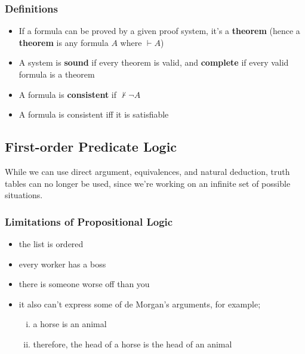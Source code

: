 \documentclass[a4paper, 12pt]{article}
\begin{document}
        \subsubsection*{Definitions}
        \begin{itemize}
            \item If a formula can be proved by a given proof system, it's a \textbf{theorem} (hence a \textbf{theorem} is any formula $A$ where $\vdash A$)
            \item A system is \textbf{sound} if every theorem is valid, and \textbf{complete} if every valid formula is a theorem
            \item A formula is \textbf{consistent} if $\nvdash \neg A$
            \item A formula is consistent iff it is satisfiable
        \end{itemize}
        \subsection*{First-order Predicate Logic}
        While we can use direct argument, equivalences, and natural deduction, truth tables can no longer be used, since we're working on an infinite set of possible situations.
        \subsubsection*{Limitations of Propositional Logic}
        \begin{itemize}
            \item the list is ordered
            \item every worker has a boss
            \item there is someone worse off than you
            \item it also can't express some of de Morgan's arguments, for example;
                \begin{enumerate}[i.]
                    \item a horse is an animal
                    \item therefore, the head of a horse is the head of an animal
                \end{enumerate}
        \end{itemize}
\end{document}
